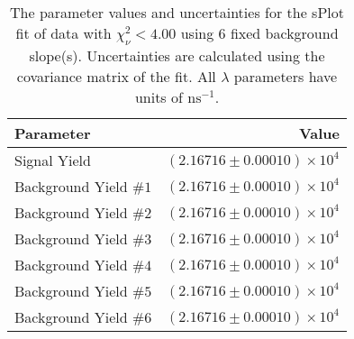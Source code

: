 
\begin{table}
    \begin{center}
        \begin{tabular}{lr}\toprule
            Parameter & Value \\\midrule
            Signal Yield & $(2.16716 \pm 0.00010) \times 10^{4}$ \\
            Background Yield $\#1$ & $(2.16716 \pm 0.00010) \times 10^{4}$ \\
            Background Yield $\#2$ & $(2.16716 \pm 0.00010) \times 10^{4}$ \\
            Background Yield $\#3$ & $(2.16716 \pm 0.00010) \times 10^{4}$ \\
            Background Yield $\#4$ & $(2.16716 \pm 0.00010) \times 10^{4}$ \\
            Background Yield $\#5$ & $(2.16716 \pm 0.00010) \times 10^{4}$ \\
            Background Yield $\#6$ & $(2.16716 \pm 0.00010) \times 10^{4}$ \\\bottomrule
        \end{tabular}
        \caption{The parameter values and uncertainties for the sPlot fit of data with $\chi^2_\nu < 4.00$ using 6 fixed background slope(s). Uncertainties are calculated using the covariance matrix of the fit. All $\lambda$ parameters have units of $\si{\nano\second}^{-1}$.}
    \end{center}
\end{table}
